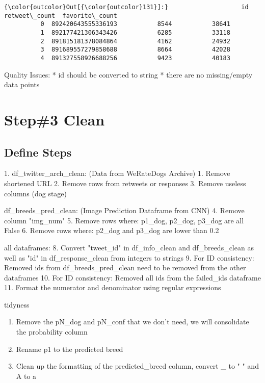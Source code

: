 \documentclass[11pt]{article}
\providecommand{\tightlist}{%
      \setlength{\itemsep}{0pt}\setlength{\parskip}{0pt}}
\begin{document}
\begin{Verbatim}[commandchars=\\\{\}]
{\color{outcolor}Out[{\color{outcolor}131}]:}                    id  retweet\_count  favorite\_count
          0  892420643555336193           8544           38641
          1  892177421306343426           6285           33118
          2  891815181378084864           4162           24932
          3  891689557279858688           8664           42028
          4  891327558926688256           9423           40183
\end{Verbatim}
            
    Quality Issues: * id should be converted to string * there are no
missing/empty data points

    \section{Step\#3 Clean}\label{step3-clean}

    \subsection{Define Steps}\label{define-steps}

     1. df\_twitter\_arch\_clean: (Data from WeRateDogs Archive) 1. Remove
shortened URL 2. Remove rows from retweets or responses 3. Remove
useless columns (dog stage)

 df\_breeds\_pred\_clean: (Image Prediction Dataframe from CNN) 4.
Remove column "img\_num" 5. Remove rows where: p1\_dog, p2\_dog, p3\_dog
are all False 6. Remove rows where: p2\_dog and p3\_dog are lower than
0.2

 all dataframes: 8. Convert "tweet\_id" in df\_info\_clean and
df\_breeds\_clean as well as "id" in df\_response\_clean from integers
to strings 9. For ID consistency: Removed ids from
df\_breeds\_pred\_clean need to be removed from the other dataframes 10.
For ID consistency: Removed all ids from the failed\_ids dataframe 11.
Format the numerator and denominator using regular expressions

 tidyness

\begin{enumerate}
\def\labelenumi{\arabic{enumi}.}
\tightlist
\item
  Remove the pN\_dog and pN\_conf that we don't need, we will
  consolidate the probability column
\item
  Rename p1 to the predicted breed
\item
  Clean up the formatting of the predicted\_breed column, convert \_ to
  " " and A to a
\end{enumerate}
\end{document}
